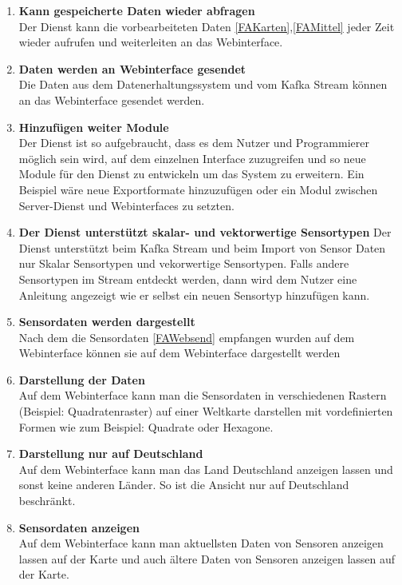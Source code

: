 \begin{enumerate}[label=\textbf{PF\arabic{enumi}0}]
	\item \textbf{Kann gespeicherte Daten wieder abfragen}\\
		Der Dienst kann die vorbearbeiteten Daten  \ref{FAKarten},\ref{FAMittel} jeder Zeit wieder aufrufen und weiterleiten an das Webinterface.
		
	\item \textbf{Daten werden an Webinterface gesendet} \label{FAWebsend}\\
		Die Daten aus dem Datenerhaltungssystem und vom Kafka Stream können an das Webinterface gesendet werden.
	 	
	 \item \textbf{Hinzufügen weiter Module}\\
		 Der Dienst ist so aufgebraucht, dass es dem Nutzer und Programmierer möglich sein wird, auf dem einzelnen Interface zuzugreifen und so neue Module für den Dienst zu entwickeln um das System zu erweitern. Ein Beispiel wäre neue Exportformate hinzuzufügen oder ein Modul zwischen Server-Dienst und Webinterfaces zu setzten. 
	 
	 \item \textbf{Der Dienst unterstützt skalar- und vektorwertige Sensortypen}
	 	Der Dienst unterstützt beim Kafka Stream und beim Import von Sensor Daten nur Skalar Sensortypen und vekorwertige Sensortypen. Falls andere Sensortypen im Stream entdeckt werden, dann wird dem Nutzer eine Anleitung angezeigt wie er selbst ein neuen Sensortyp hinzufügen kann. 
	 	
	 \item \textbf{Sensordaten werden dargestellt}\\
	 	Nach dem die Sensordaten \ref{FAWebsend} empfangen wurden auf dem Webinterface können sie auf dem Webinterface dargestellt werden
	 
	 \item \textbf{Darstellung der Daten}\\
	 	Auf dem Webinterface kann man die Sensordaten in verschiedenen Rastern (Beispiel: Quadratenraster) auf einer Weltkarte darstellen mit vordefinierten Formen wie zum Beispiel: Quadrate oder Hexagone.
	 
	 \item \textbf{Darstellung nur auf Deutschland}\\
	 	Auf dem Webinterface kann man das Land Deutschland anzeigen lassen und sonst keine anderen Länder. So ist die Ansicht nur auf Deutschland beschränkt.
	 
	 \item \textbf{Sensordaten anzeigen}\\
		Auf dem Webinterface kann man aktuellsten Daten von Sensoren anzeigen lassen auf der Karte und auch ältere Daten von Sensoren anzeigen lassen auf der Karte.
		

\end{enumerate}
